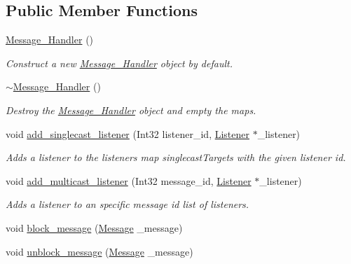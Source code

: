 \subsection*{Public Member Functions}
\begin{DoxyCompactItemize}
\item 
\mbox{\hyperlink{classbanita_1_1_message___handler_ab610f5ffc535a86ed43c24323277225c}{Message\+\_\+\+Handler}} ()
\begin{DoxyCompactList}\small\item\em Construct a new \mbox{\hyperlink{classbanita_1_1_message___handler}{Message\+\_\+\+Handler}} object by default. \end{DoxyCompactList}\item 
\mbox{\hyperlink{classbanita_1_1_message___handler_afd3d620e8b639c50504fba6783e4e31f}{$\sim$\+Message\+\_\+\+Handler}} ()
\begin{DoxyCompactList}\small\item\em Destroy the \mbox{\hyperlink{classbanita_1_1_message___handler}{Message\+\_\+\+Handler}} object and empty the maps. \end{DoxyCompactList}\item 
void \mbox{\hyperlink{classbanita_1_1_message___handler_ac1606f794ec41c49d406524da8450e2f}{add\+\_\+singlecast\+\_\+listener}} (Int32 listener\+\_\+id, \mbox{\hyperlink{structbanita_1_1_message___handler_1_1_listener}{Listener}} $\ast$\+\_\+listener)
\begin{DoxyCompactList}\small\item\em Adds a listener to the listeners map singlecast\+Targets with the given listener id. \end{DoxyCompactList}\item 
void \mbox{\hyperlink{classbanita_1_1_message___handler_a606a8f9a0c7fa63f74d53062a06a25fe}{add\+\_\+multicast\+\_\+listener}} (Int32 message\+\_\+id, \mbox{\hyperlink{structbanita_1_1_message___handler_1_1_listener}{Listener}} $\ast$\+\_\+listener)
\begin{DoxyCompactList}\small\item\em Adds a listener to an specific message id list of listeners. \end{DoxyCompactList}\item 
void \mbox{\hyperlink{classbanita_1_1_message___handler_a3833f61bd8a4ef5e0f625b1ed5306b1c}{block\+\_\+message}} (\mbox{\hyperlink{classbanita_1_1_message}{Message}} \+\_\+message)
\item 
void \mbox{\hyperlink{classbanita_1_1_message___handler_ae1f927231f5e2b9807c281dc83decb1d}{unblock\+\_\+message}} (\mbox{\hyperlink{classbanita_1_1_message}{Message}} \+\_\+message)

\end{DoxyCompactItemize}
